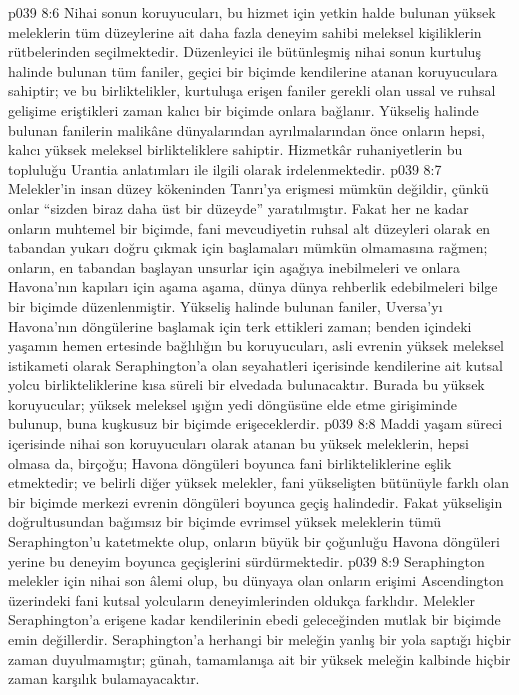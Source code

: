 \vs p039 8:6 Nihai sonun koruyucuları, bu hizmet için yetkin halde bulunan yüksek meleklerin tüm düzeylerine ait daha fazla deneyim sahibi meleksel kişiliklerin rütbelerinden seçilmektedir. Düzenleyici ile bütünleşmiş nihai sonun kurtuluş halinde bulunan tüm faniler, geçici bir biçimde kendilerine atanan koruyuculara sahiptir; ve bu birliktelikler, kurtuluşa erişen faniler gerekli olan ussal ve ruhsal gelişime eriştikleri zaman kalıcı bir biçimde onlara bağlanır. Yükseliş halinde bulunan fanilerin malikâne dünyalarından ayrılmalarından önce onların hepsi, kalıcı yüksek meleksel birlikteliklere sahiptir. Hizmetkâr ruhaniyetlerin bu topluluğu Urantia anlatımları ile ilgili olarak irdelenmektedir.
\vs p039 8:7 Melekler’in insan düzey kökeninden Tanrı’ya erişmesi mümkün değildir, çünkü onlar “sizden biraz daha üst bir düzeyde” yaratılmıştır. Fakat her ne kadar onların muhtemel bir biçimde, fani mevcudiyetin ruhsal alt düzeyleri olarak en tabandan yukarı doğru çıkmak için başlamaları mümkün olmamasına rağmen; onların, en tabandan başlayan unsurlar için aşağıya inebilmeleri ve onlara Havona’nın kapıları için aşama aşama, dünya dünya rehberlik edebilmeleri bilge bir biçimde düzenlenmiştir. Yükseliş halinde bulunan faniler, Uversa’yı Havona’nın döngülerine başlamak için terk ettikleri zaman; benden içindeki yaşamın hemen ertesinde bağlılığın bu koruyucuları, asli evrenin yüksek meleksel istikameti olarak Seraphington’a olan seyahatleri içerisinde kendilerine ait kutsal yolcu birlikteliklerine kısa süreli bir elvedada bulunacaktır. Burada bu yüksek koruyucular; yüksek meleksel ışığın yedi döngüsüne elde etme girişiminde bulunup, buna kuşkusuz bir biçimde erişeceklerdir.
\vs p039 8:8 Maddi yaşam süreci içerisinde nihai son koruyucuları olarak atanan bu yüksek meleklerin, hepsi olmasa da, birçoğu; Havona döngüleri boyunca fani birlikteliklerine eşlik etmektedir; ve belirli diğer yüksek melekler, fani yükselişten bütünüyle farklı olan bir biçimde merkezi evrenin döngüleri boyunca geçiş halindedir. Fakat yükselişin doğrultusundan bağımsız bir biçimde evrimsel yüksek meleklerin tümü Seraphington’u katetmekte olup, onların büyük bir çoğunluğu Havona döngüleri yerine bu deneyim boyunca geçişlerini sürdürmektedir.
\vs p039 8:9 Seraphington melekler için nihai son âlemi olup, bu dünyaya olan onların erişimi Ascendington üzerindeki fani kutsal yolcuların deneyimlerinden oldukça farklıdır. Melekler Seraphington’a erişene kadar kendilerinin ebedi geleceğinden mutlak bir biçimde emin değillerdir. Seraphington’a herhangi bir meleğin yanlış bir yola saptığı hiçbir zaman duyulmamıştır; günah, tamamlanışa ait bir yüksek meleğin kalbinde hiçbir zaman karşılık bulamayacaktır.
